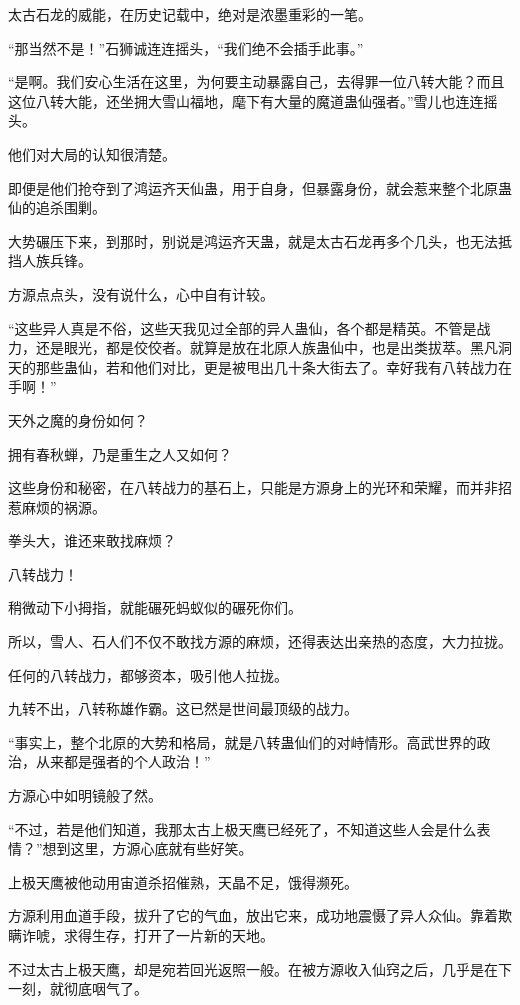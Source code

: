 \begin{this_body}
太古石龙的威能，在历史记载中，绝对是浓墨重彩的一笔。

“那当然不是！”石狮诚连连摇头，“我们绝不会插手此事。”

“是啊。我们安心生活在这里，为何要主动暴露自己，去得罪一位八转大能？而且这位八转大能，还坐拥大雪山福地，麾下有大量的魔道蛊仙强者。”雪儿也连连摇头。

他们对大局的认知很清楚。

即便是他们抢夺到了鸿运齐天仙蛊，用于自身，但暴露身份，就会惹来整个北原蛊仙的追杀围剿。

大势碾压下来，到那时，别说是鸿运齐天蛊，就是太古石龙再多个几头，也无法抵挡人族兵锋。

方源点点头，没有说什么，心中自有计较。

“这些异人真是不俗，这些天我见过全部的异人蛊仙，各个都是精英。不管是战力，还是眼光，都是佼佼者。就算是放在北原人族蛊仙中，也是出类拔萃。黑凡洞天的那些蛊仙，若和他们对比，更是被甩出几十条大街去了。幸好我有八转战力在手啊！”

天外之魔的身份如何？

拥有春秋蝉，乃是重生之人又如何？

这些身份和秘密，在八转战力的基石上，只能是方源身上的光环和荣耀，而并非招惹麻烦的祸源。

拳头大，谁还来敢找麻烦？

八转战力！

稍微动下小拇指，就能碾死蚂蚁似的碾死你们。

所以，雪人、石人们不仅不敢找方源的麻烦，还得表达出亲热的态度，大力拉拢。

任何的八转战力，都够资本，吸引他人拉拢。

九转不出，八转称雄作霸。这已然是世间最顶级的战力。

“事实上，整个北原的大势和格局，就是八转蛊仙们的对峙情形。高武世界的政治，从来都是强者的个人政治！”

方源心中如明镜般了然。

“不过，若是他们知道，我那太古上极天鹰已经死了，不知道这些人会是什么表情？”想到这里，方源心底就有些好笑。

上极天鹰被他动用宙道杀招催熟，天晶不足，饿得濒死。

方源利用血道手段，拔升了它的气血，放出它来，成功地震慑了异人众仙。靠着欺瞒诈唬，求得生存，打开了一片新的天地。

不过太古上极天鹰，却是宛若回光返照一般。在被方源收入仙窍之后，几乎是在下一刻，就彻底咽气了。


\end{this_body}
